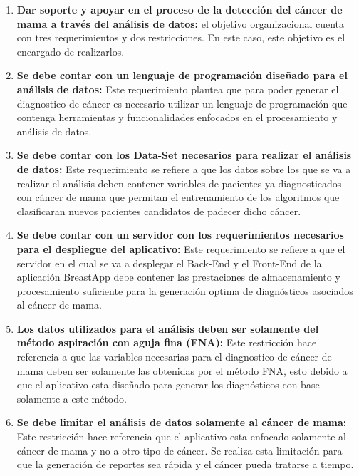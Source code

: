 \begin{enumerate}[label=\textbf{\arabic*})]
\item  \textbf{Dar soporte y apoyar en el proceso de la detección del cáncer de mama a través del análisis de datos:} el objetivo organizacional cuenta con tres requerimientos y dos restricciones. En este caso, este objetivo es el encargado de realizarlos.

\item  \textbf{Se debe contar con un lenguaje de programación diseñado para el análisis de datos:} Este requerimiento plantea que para poder generar el diagnostico de cáncer es necesario utilizar un lenguaje de programación que contenga herramientas y funcionalidades enfocados en el procesamiento y análisis de datos.

\item  \textbf{Se debe contar con los Data-Set necesarios para realizar el análisis de datos:} Este requerimiento se refiere a que los datos sobre los que se va a realizar el análisis deben contener variables de pacientes ya diagnosticados con cáncer de mama que permitan el entrenamiento de los algoritmos que clasificaran nuevos pacientes  candidatos de padecer dicho cáncer.

\newpage
\item  \textbf{Se debe contar con un servidor con los requerimientos necesarios para el despliegue del aplicativo:} Este requerimiento se refiere a que el servidor en el cual se va a desplegar el Back-End y el Front-End de la aplicación BreastApp debe contener las prestaciones de almacenamiento y procesamiento suficiente para la generación  optima de diagnósticos asociados al cáncer de mama.

\item  \textbf{Los datos utilizados para el análisis deben ser solamente del método aspiración con aguja fina (FNA):} Este restricción hace referencia a que las variables necesarias para el diagnostico de cáncer de mama deben ser solamente las obtenidas por el método FNA, esto debido a que el aplicativo esta diseñado para generar los diagnósticos con base solamente a este método.

\item  \textbf{Se debe limitar el análisis de datos solamente al cáncer de mama:} Este restricción hace referencia que el aplicativo esta enfocado solamente al cáncer de mama y no a otro tipo de cáncer. Se realiza esta limitación para que la generación de reportes sea rápida y el cáncer pueda tratarse a tiempo.
\end{enumerate}


